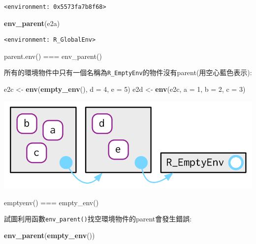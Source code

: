 \documentclass[]{book}
\newenvironment{Shaded}{\begin{snugshade}}{\end{snugshade}}
\newcommand{\DataTypeTok}[1]{\textcolor[rgb]{0.13,0.29,0.53}{#1}}
\newcommand{\DecValTok}[1]{\textcolor[rgb]{0.00,0.00,0.81}{#1}}
\newcommand{\KeywordTok}[1]{\textcolor[rgb]{0.13,0.29,0.53}{\textbf{#1}}}
\newcommand{\NormalTok}[1]{#1}
\newcommand{\StringTok}[1]{\textcolor[rgb]{0.31,0.60,0.02}{#1}}
\theoremstyle{definition}
\theoremstyle{definition}
\theoremstyle{definition}
\theoremstyle{remark}
\begin{document}
\begin{verbatim}
<environment: 0x5573fa7b8f68>
\end{verbatim}

\begin{Shaded}
\begin{Highlighting}[]
\KeywordTok{env_parent}\NormalTok{(e2a)}
\end{Highlighting}
\end{Shaded}

\begin{verbatim}
<environment: R_GlobalEnv>
\end{verbatim}

parent.env() === env\_parent()

所有的環境物件中只有一個名稱為\texttt{R\_EmptyEnv}的物件沒有parent(用空心藍色表示):

\begin{Shaded}
\begin{Highlighting}[]
\NormalTok{e2c <-}\StringTok{ }\KeywordTok{env}\NormalTok{(}\KeywordTok{empty_env}\NormalTok{(), }\DataTypeTok{d =} \DecValTok{4}\NormalTok{, }\DataTypeTok{e =} \DecValTok{5}\NormalTok{)}
\NormalTok{e2d <-}\StringTok{ }\KeywordTok{env}\NormalTok{(e2c, }\DataTypeTok{a =} \DecValTok{1}\NormalTok{, }\DataTypeTok{b =} \DecValTok{2}\NormalTok{, }\DataTypeTok{c =} \DecValTok{3}\NormalTok{)}
\end{Highlighting}
\end{Shaded}

\begin{center}\includegraphics{diagrams/environments/parents-empty} \end{center}

emptyenv() === empty\_env()

試圖利用函數\texttt{env\_parent()}找空環境物件的parent會發生錯誤:

\begin{Shaded}
\begin{Highlighting}[]
\KeywordTok{env_parent}\NormalTok{(}\KeywordTok{empty_env}\NormalTok{())}
\end{Highlighting}
\end{Shaded}
\end{document}
